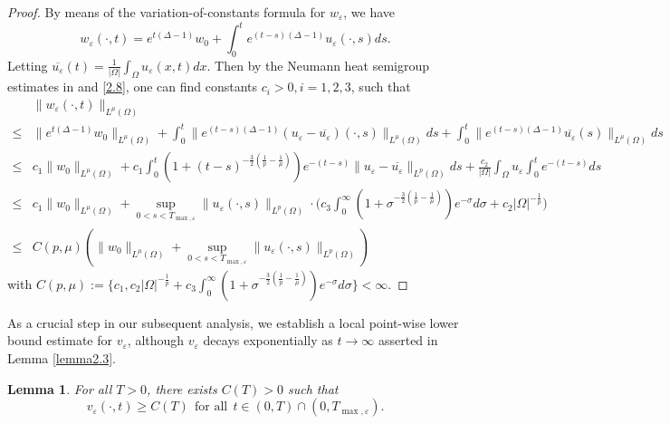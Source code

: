 \documentclass[12pt]{article}
\theoremstyle{plain}
\newtheorem{lemma}{Lemma}[section]
\theoremstyle{definition}
\numberwithin{equation}{section}
\begin{document}
\begin{proof}[Proof]
	By means of the variation-of-constants formula for $w_\varepsilon$, we have
	\begin{equation*}
		w_\varepsilon(\cdot,t)=e^{t(\Delta-1)}w_{0}+\int_{0}^{t}e^{(t-s)(\Delta-1)}u_\varepsilon(\cdot,s)ds.
	\end{equation*}
Letting $\overline{u_\varepsilon}(t) = \frac{1}{|\Omega|}\int_\Omega u_\varepsilon(x,t) dx$. Then by the Neumann heat semigroup estimates in \cite{Winkler(2010)} and  \eqref{2.8}, one can find constants $c_i>0, i=1,2,3$,
 such that
\begin{align*}
		&\|w_\varepsilon(\cdot,t)\|_{L^{\mu}(\Omega)}\\
\leq&\|e^{t(\Delta-1)}w_{0}\|_{L^{\mu}(\Omega)}+\int_{0}^{t}\|e^{(t-s)(\Delta-1)}(u_\varepsilon-\overline{u_\varepsilon})(\cdot,s)\|_{L^{\mu}(\Omega)}ds+\int_{0}^{t}\|e^{(t-s)(\Delta-1)}\overline{u_\varepsilon}(s)\|_{L^{\mu}(\Omega)}ds\\
\leq & c_1\|w_{0}\|_{L^{\mu}(\Omega)}+
c_1\int_{0}^{t}(1+(t-s)^{-\frac{3}{2}(\frac1 p-\frac{1}{\mu})})e^{-(t-s)}\|u_\varepsilon-\overline{u_\varepsilon}\|_{L^{p}(\Omega)}ds+
\frac{c_2}{|\Omega|}\int_\Omega u_\varepsilon\int_0^t e^{-(t-s)}ds\\
		\leq & c_1\big\|w_{0}\|_{L^{\mu}(\Omega)}+\sup\limits_{0<s<T_{\max,\varepsilon}}\|u_\varepsilon(\cdot,s)\|_{L^p(\Omega)}\cdot\bigg(c_3\int_{0}^{\infty}(1+\sigma^{-\frac{3}{2}(\frac1 p-\frac{1}{\mu})})e^{-\sigma}d\sigma+c_2|\Omega|^{-\frac1 p}\bigg)\\
		\leq &
C(p,\mu)(\|w_{0}\|_{L^{\mu}(\Omega)}+\sup\limits_{0<s<T_{\max,\varepsilon}}\|u_\varepsilon(\cdot,s)\|_{L^p(\Omega)})
\end{align*}
with $C(p,\mu):=\{c_1,c_2|\Omega|^{-\frac 1p}+c_3\int_{0}^{\infty}(1+\sigma^{-\frac{3}{2}(\frac1 p-\frac{1}{\mu})})e^{-\sigma}d\sigma\}<\infty$. %
\end{proof}
As a crucial step in our subsequent analysis, we establish a local point-wise lower bound estimate for $v_\varepsilon$, although $v_\varepsilon$ decays exponentially as $t\to\infty$ asserted in  Lemma \ref{lemma2.3}.
\begin{lemma}\label{lemma2.5}
For all $T>0$, there exists $C(T)>0$ such that
\begin{equation}\label{2.22}
v_\varepsilon(\cdot,t)\geq C(T)~~\mbox{for all}~~t\in(0,T)\cap(0,T_{\max,\varepsilon}).
\end{equation}
\end{lemma}
\end{document}
